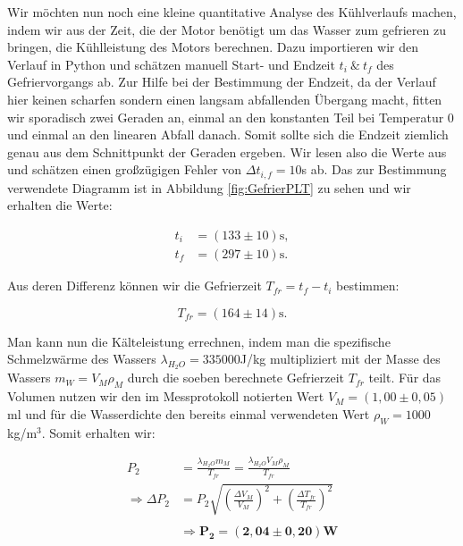 \documentclass{article}
\begin{document}
Wir möchten nun noch eine kleine quantitative Analyse des Kühlverlaufs machen, indem wir aus der Zeit, die der Motor benötigt um das Wasser zum gefrieren zu bringen, die Kühlleistung des Motors berechnen. Dazu importieren wir den Verlauf in Python und schätzen manuell Start- und Endzeit $t_i \ \& \ t_f$ des Gefriervorgangs ab. Zur Hilfe bei der Bestimmung der Endzeit, da der Verlauf hier keinen scharfen sondern einen langsam abfallenden Übergang macht, fitten wir sporadisch zwei Geraden an, einmal an den konstanten Teil bei Temperatur 0 und einmal an den linearen Abfall danach. Somit sollte sich die Endzeit ziemlich genau aus dem Schnittpunkt der Geraden ergeben. Wir lesen also die Werte aus und schätzen einen großzügigen Fehler von $\Delta t_{i,f} = 10$s ab. Das zur Bestimmung verwendete Diagramm ist in Abbildung \ref{fig:GefrierPLT} zu sehen und wir erhalten die Werte:

\begin{equation}
    \begin{split}
        t_i &= (133 \pm 10) \text{s}, \\
        t_f &= (297 \pm 10) \text{s}.
    \end{split}
\end{equation}

Aus deren Differenz können wir die Gefrierzeit $T_{fr} = t_f - t_i$ bestimmen:

\begin{equation}
    T_{fr} = (164 \pm 14) \text{s}.
\end{equation}

Man kann nun die Kälteleistung errechnen, indem man die spezifische Schmelzwärme des Wassers $\lambda_{H_2O} = 335000$J/kg multipliziert mit der Masse des Wassers $m_W = V_M \rho_M$ durch die soeben berechnete Gefrierzeit $T_{fr}$ teilt. Für das Volumen nutzen wir den im Messprotokoll notierten Wert $V_M = (1,00 \pm 0,05)$ml und für die Wasserdichte den bereits einmal verwendeten Wert $\rho_W = 1000$kg/m$^3$. Somit erhalten wir:

\begin{equation}
    \begin{split}
        P_2 &= \frac{\lambda_{H_2O} m_M}{T_{fr}} = \frac{\lambda_{H_2O} V_M \rho_M}{T_{fr}} \\
        \Rightarrow \Delta P_2 &= P_2 \sqrt{\left( \frac{\Delta V_M}{V_M} \right)^2 + \left(  \frac{\Delta T_{fr}}{T_{fr}} \right)^2} \\ \\
        &\Rightarrow \bm{P_2} = \bm{(2,04 \pm 0,20)} \textbf{W}
    \end{split}
\end{equation}
\end{document}
